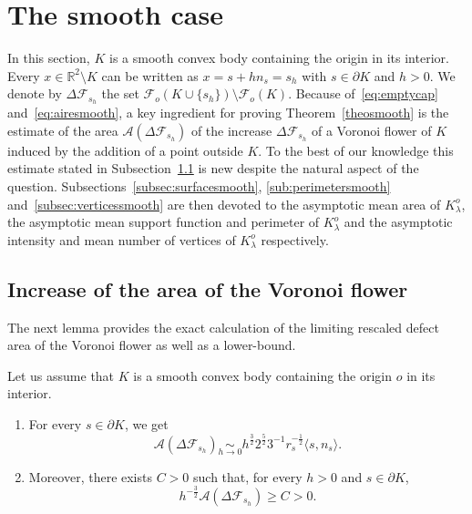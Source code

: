 \documentclass[AHL,Unicode,longabstracts,published]{cedram}
\newcommand{\cA}{\mathcal{A}}
\newcommand{\cF}{\mathcal{F}}
\newcommand{\R}{\mathbb{R}}
\newcommand{\pass}{\vspace{0.3cm}\noindent}
\newcommand{\noi}{\noindent}
\newcommand*{\romanenumi}{\renewcommand*{\theenumi}{\roman{enumi}}}
\newcommand{\R}{\mathbb{R}}
\begin{document}
\section{The smooth case}\label{sec:smooth}

In this section, $K$ is a smooth convex body containing the origin in its interior. Every $x\in\R^2\setminus K$ can be written as $x=s+hn_s=s_h$ with $s\in\partial K$ and $h>0$. We denote by $\Delta\cF_{s_h}$ the set $\cF_o(K\cup \{s_h\})\setminus \cF_o(K)$. Because of~\eqref{eq:emptycap} and~\eqref{eq:airesmooth}, a key ingredient for proving Theorem~\ref{theosmooth} is the estimate of the area $\cA(\Delta\cF_{s_h})$ of the increase $\Delta \cF_{s_h}$ of a Voronoi flower of $K$ induced by the addition of a point outside $K$. To the best of our knowledge this estimate stated in Subsection~\ref{subsec:fleursmooth} is new despite the natural aspect of the question. Subsections~\ref{subsec:surfacesmooth}, \ref{sub:perimetersmooth} and~\ref{subsec:verticessmooth} are then devoted to the asymptotic mean area of $K_{\lambda}^o$, the asymptotic mean support function and perimeter of $K_{\lambda}^o$ and the asymptotic intensity and mean number of vertices of $K_{\lambda}^o$ respectively.


\subsection{Increase of the area of the Voronoi flower}\label{subsec:fleursmooth}


The next lemma provides the exact calculation of the limiting rescaled defect area of the Voronoi flower as well as a lower-bound.

\begin{lemm}\label{lem:geom}
Let us assume that $K$ is a smooth convex body containing the origin $o$ in its interior.
\begin{enumerate}\romanenumi
\item \label{estimeevolfleur}For every $s\in\partial K$, we get
\begin{equation*}
\cA(\Delta\cF_{s_h})\underset{h\to 0}{\sim} h^{\frac{3}{2}} 2^{\frac{5}{2}}3^{-1}r_s^{-\frac1{2}}\langle s, n_s\rangle.
\end{equation*}
\item \label{eq:minorantvol}Moreover, there exists $C>0$ such that, for every $h>0$ and $s\in\partial K$,
\begin{equation*}
h^{-\frac{3}{2}}\cA(\Delta\cF_{s_h}) \ge C >0.
\end{equation*}
\end{enumerate}
\end{lemm}
\end{document}
